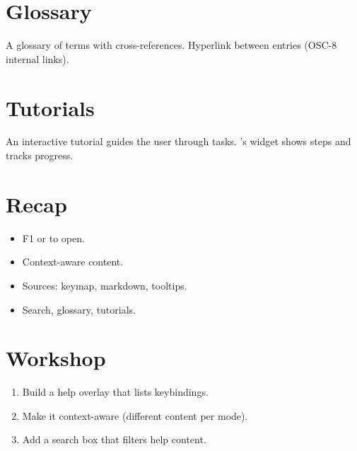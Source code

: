 \section{Glossary}

A glossary of terms with cross-references. Hyperlink
between entries (OSC-8 internal links).

\section{Tutorials}

An interactive tutorial guides the user through tasks.
\maya{}'s  widget shows steps and tracks
progress.

\section{Recap}

\begin{recap}
\begin{itemize}[leftmargin=*]
  \item F1 or  to open.
  \item Context-aware content.
  \item Sources: keymap, markdown, tooltips.
  \item Search, glossary, tutorials.
\end{itemize}
\end{recap}

\section*{Workshop}

\begin{enumerate}[leftmargin=*]
  \item Build a help overlay that lists keybindings.
  \item Make it context-aware (different content per
    mode).
  \item Add a search box that filters help content.
\end{enumerate}
